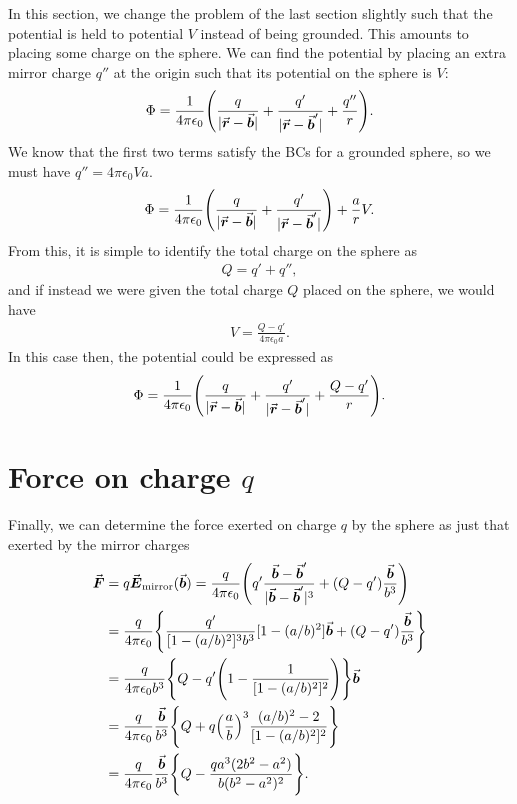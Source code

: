 In this section, we change the problem of the last section slightly such that the potential is held to potential $V$ instead of being grounded.
This amounts to placing some charge on the sphere.
We can find the potential by placing an extra mirror charge $q''$ at the origin such that its potential on the sphere is $V$:
\begin{eqnarray}
    \Phi = \frac{1}{4 \pi \epsilon_0} \Bigg( \frac{q}{|\va*{r} - \va*{b}|} + \frac{q'}{|\va*{r} - \va*{b}'|} + \frac{q''}{r} \Bigg)
.\end{eqnarray}
We know that the first two terms satisfy the BCs for a grounded sphere, so we must have $q'' = 4 \pi \epsilon_0 Va$.
\begin{eqnarray}
    \Phi = \frac{1}{4 \pi \epsilon_0} \Bigg( \frac{q}{|\va*{r} - \va*{b}|} + \frac{q'}{|\va*{r} - \va*{b}'|} \Bigg) + \frac{a}{r} V
.\end{eqnarray}
From this, it is simple to identify the total charge on the sphere as
\begin{eqnarray}
    Q = q' + q''
,\end{eqnarray}
and if instead we were given the total charge $Q$ placed on the sphere, we would have
\begin{eqnarray}
    V = \frac{Q - q'}{4 \pi \epsilon_0 a}
.\end{eqnarray}
In this case then, the potential could be expressed as
\begin{eqnarray}
    \Phi = \frac{1}{4 \pi \epsilon_0} \Bigg( \frac{q}{|\va*{r} - \va*{b}|} + \frac{q'}{|\va*{r} - \va*{b}'|} + \frac{Q - q'}{r} \Bigg)
.\end{eqnarray}


\section{Force on charge $q$}

Finally, we can determine the force exerted on charge $q$ by the sphere as just that exerted by the mirror charges
\begin{align}
    \label{eq:force-mirror}
    \va*{F} &= q \va*{E}_{\rm mirror}(\va*{b}) = \frac{q}{4 \pi \epsilon_0} \Bigg( q'\frac{\va*{b} - \va*{b}'}{|\va*{b} - \va*{b}'|^3} + (Q - q') \frac{\va*{b}}{b^3} \Bigg) \nonumber \\
    &= \frac{q}{4 \pi \epsilon_0} \Bigg\{ \frac{q'}{[1 - (a/b)^2]^3 b^3}[1 - (a/b)^2]\va*{b} + (Q - q') \frac{\va*{b}}{b^3} \Bigg\} \nonumber \\
    &= \frac{q}{4 \pi \epsilon_0 b^3} \Bigg\{ Q - q' \Bigg( 1 - \frac{1}{[1 - (a/b)^2]^2} \Bigg) \Bigg\} \va*{b} \nonumber \\
    &= \frac{q}{4 \pi \epsilon_0} \frac{\va*{b}}{b^3} \Bigg\{ Q + q \Big( \frac{a}{b} \Big)^3 \frac{(a/b)^2 - 2}{[1 - (a/b)^2]^2} \Bigg\} \nonumber \\
    &= \frac{q}{4 \pi \epsilon_0} \frac{\va*{b}}{b^3} \Bigg\{ Q - \frac{q a^3(2b^2 - a^2)}{b(b^2 - a^2)^2} \Bigg\}
.\end{align}

